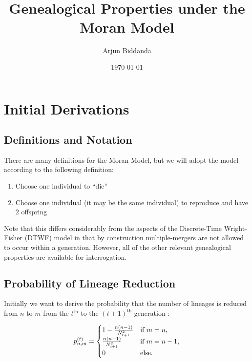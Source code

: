 \documentclass[11pt]{article}
\title{Genealogical Properties under the Moran Model}\author{Arjun Biddanda}
\date{\today}
\begin{document}
\maketitle

\section{Initial Derivations}

\subsection{Definitions and Notation}

There are many definitions for the Moran Model, but we will adopt the model according to the following definition:

\begin{enumerate}
	\item Choose one individual to ``die''
	\item Choose one individual (it may be the same individual) to reproduce and have 2 offspring
\end{enumerate}

Note that this differs considerably from the aspects of the Discrete-Time Wright-Fisher (DTWF) model in that by construction multiple-mergers are not allowed to occur within a generation. However, all of the other relevant genealogical properties are available for interrogation.

\subsection{Probability of Lineage Reduction}
Initially we want to derive the probability that the number of lineages is reduced from $n$ to $m$ from the $t^{\text{th}}$ to the $(t+1)^{\text{th}}$ generation :



\begin{equation*}
	p^{(t)}_{n,m} = 
	\begin{cases} 1 - \frac{n(n-1)}{N^2_{t+1}}  & \text{if $m = n$,}
		\\
		\frac{n(n-1)}{N^2_{t+1}} &\text{if $ m = n - 1$,}
		\\
		0 &\text{else.}
	\end{cases}
\end{equation*}
\end{document}
